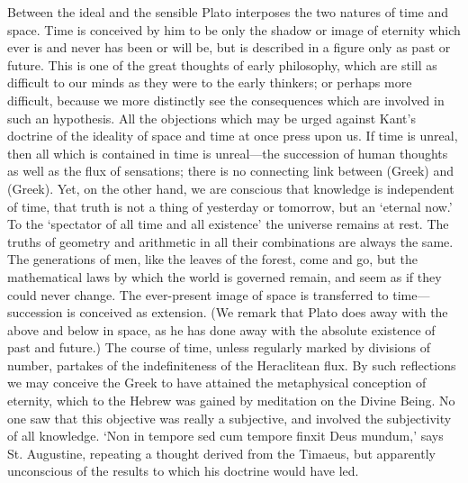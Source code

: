 \documentclass[11pt,letter]{article}
\begin{document}
\par  Between the ideal and the sensible Plato interposes the two natures of time and space. Time is conceived by him to be only the shadow or image of eternity which ever is and never has been or will be, but is described in a figure only as past or future. This is one of the great thoughts of early philosophy, which are still as difficult to our minds as they were to the early thinkers; or perhaps more difficult, because we more distinctly see the consequences which are involved in such an hypothesis. All the objections which may be urged against Kant’s doctrine of the ideality of space and time at once press upon us. If time is unreal, then all which is contained in time is unreal—the succession of human thoughts as well as the flux of sensations; there is no connecting link between (Greek) and (Greek). Yet, on the other hand, we are conscious that knowledge is independent of time, that truth is not a thing of yesterday or tomorrow, but an ‘eternal now.’ To the ‘spectator of all time and all existence’ the universe remains at rest. The truths of geometry and arithmetic in all their combinations are always the same. The generations of men, like the leaves of the forest, come and go, but the mathematical laws by which the world is governed remain, and seem as if they could never change. The ever-present image of space is transferred to time—succession is conceived as extension. (We remark that Plato does away with the above and below in space, as he has done away with the absolute existence of past and future.) The course of time, unless regularly marked by divisions of number, partakes of the indefiniteness of the Heraclitean flux. By such reflections we may conceive the Greek to have attained the metaphysical conception of eternity, which to the Hebrew was gained by meditation on the Divine Being. No one saw that this objective was really a subjective, and involved the subjectivity of all knowledge. ‘Non in tempore sed cum tempore finxit Deus mundum,’ says St. Augustine, repeating a thought derived from the Timaeus, but apparently unconscious of the results to which his doctrine would have led.
\end{document}
